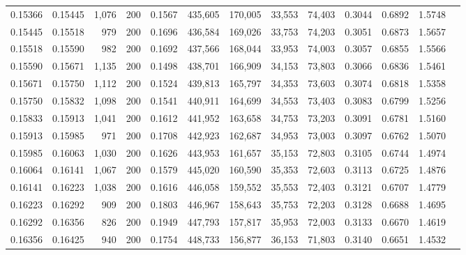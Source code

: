 \begin{tabular}{rrrrrrrrrrrrr}
0.15366 & 0.15445 &  1,076 & 200 &                                     0.1567 & 435,605 & 170,005 &  33,553 &  74,403 & 0.3044 & 0.6892 & 1.5748 \\
0.15445 & 0.15518 &    979 & 200 &                                     0.1696 & 436,584 & 169,026 &  33,753 &  74,203 & 0.3051 & 0.6873 & 1.5657 \\
0.15518 & 0.15590 &    982 & 200 &                                     0.1692 & 437,566 & 168,044 &  33,953 &  74,003 & 0.3057 & 0.6855 & 1.5566 \\
0.15590 & 0.15671 &  1,135 & 200 &                                     0.1498 & 438,701 & 166,909 &  34,153 &  73,803 & 0.3066 & 0.6836 & 1.5461 \\
0.15671 & 0.15750 &  1,112 & 200 &                                     0.1524 & 439,813 & 165,797 &  34,353 &  73,603 & 0.3074 & 0.6818 & 1.5358 \\
0.15750 & 0.15832 &  1,098 & 200 &                                     0.1541 & 440,911 & 164,699 &  34,553 &  73,403 & 0.3083 & 0.6799 & 1.5256 \\
0.15833 & 0.15913 &  1,041 & 200 &                                     0.1612 & 441,952 & 163,658 &  34,753 &  73,203 & 0.3091 & 0.6781 & 1.5160 \\
0.15913 & 0.15985 &    971 & 200 &                                     0.1708 & 442,923 & 162,687 &  34,953 &  73,003 & 0.3097 & 0.6762 & 1.5070 \\
0.15985 & 0.16063 &  1,030 & 200 &                                     0.1626 & 443,953 & 161,657 &  35,153 &  72,803 & 0.3105 & 0.6744 & 1.4974 \\
0.16064 & 0.16141 &  1,067 & 200 &                                     0.1579 & 445,020 & 160,590 &  35,353 &  72,603 & 0.3113 & 0.6725 & 1.4876 \\
0.16141 & 0.16223 &  1,038 & 200 &                                     0.1616 & 446,058 & 159,552 &  35,553 &  72,403 & 0.3121 & 0.6707 & 1.4779 \\
0.16223 & 0.16292 &    909 & 200 &                                     0.1803 & 446,967 & 158,643 &  35,753 &  72,203 & 0.3128 & 0.6688 & 1.4695 \\
0.16292 & 0.16356 &    826 & 200 &                                     0.1949 & 447,793 & 157,817 &  35,953 &  72,003 & 0.3133 & 0.6670 & 1.4619 \\
0.16356 & 0.16425 &    940 & 200 &                                     0.1754 & 448,733 & 156,877 &  36,153 &  71,803 & 0.3140 & 0.6651 & 1.4532 \\

\end{tabular}
